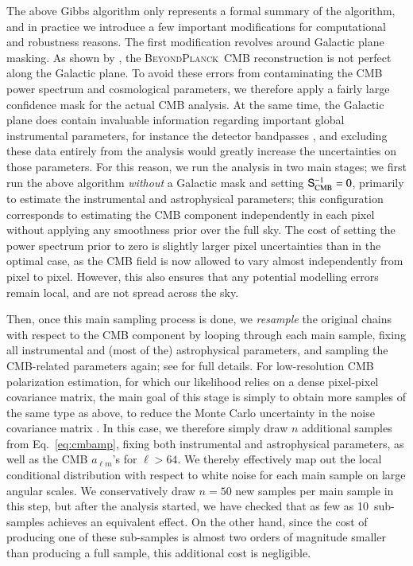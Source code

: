 \documentclass[twocolumn]{aa}
\renewcommand{\S}[0]{\tens{S}}
\newcommand{\BP}{\textsc{BeyondPlanck}}
\begin{document}
The above Gibbs algorithm only represents a formal summary of the
algorithm, and in practice we introduce a few important modifications
for computational and robustness reasons. The first modification
revolves around Galactic plane masking. As shown by \citet{bp11}, the
\BP\ CMB reconstruction is not perfect along the Galactic plane. To
avoid these errors from contaminating the CMB power spectrum and
cosmological parameters, we therefore apply a fairly large confidence
mask for the actual CMB analysis. At the same time, the Galactic plane
does contain invaluable information regarding important global
instrumental parameters, for instance the detector bandpasses
\citep{bp09}, and excluding these data entirely from the analysis
would greatly increase the uncertainties on those parameters. For this
reason, we run the analysis in two main stages; we first run the above
algorithm \emph{without} a Galactic mask and setting
$\S_{\mathrm{CMB}}^{-1} = 0$, primarily to estimate the
instrumental and astrophysical parameters; this configuration
corresponds to estimating the CMB component independently in each
pixel without applying any smoothness prior over the full sky. The
cost of setting the power spectrum prior to zero is slightly larger
pixel uncertainties than in the optimal case, as the CMB field is now
allowed to vary almost independently from pixel to pixel. However,
this also ensures that any potential modelling errors remain local,
and are not spread across the sky.

Then, once this main sampling process is done, we \emph{resample} the
original chains with respect to the CMB component by looping through
each main sample, fixing all instrumental and (most of the)
astrophysical parameters, and sampling the CMB-related parameters
again; see \citet{bp11} for full details. For low-resolution CMB
polarization estimation, for which our likelihood relies on a dense
pixel-pixel covariance matrix, the main goal of this stage is simply
to obtain more samples of the same type as above, to reduce the Monte
Carlo uncertainty in the noise covariance matrix
\citep{sellentin2016}. In this case, we therefore simply draw $n$
additional samples from Eq.~\eqref{eq:cmbamp}, fixing both
instrumental and astrophysical parameters, as well as the CMB $a_{\ell
  m}$'s for $\ell>64$. We thereby effectively map out the local
conditional distribution with respect to white noise for each main sample
on large angular scales. We conservatively draw $n=50$ new samples per
main sample in this step, but after the analysis started, we have
checked that as few as 10~sub-samples achieves an equivalent
effect. On the other hand, since the cost of producing one of these
sub-samples is almost two orders of magnitude smaller than producing a
full sample, this additional cost is negligible.
\end{document}
